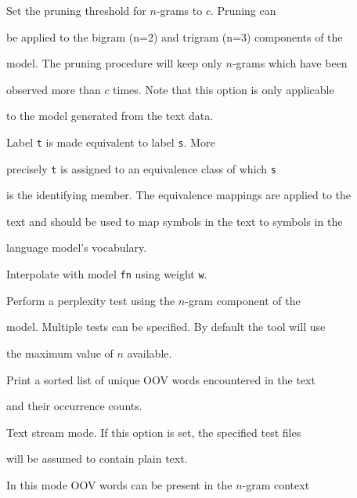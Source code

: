 \begin{optlist}





   Set the pruning threshold for $n$-grams to $c$.  Pruning can


	be applied to the bigram (n=2) and trigram (n=3) components of the


	model. The pruning procedure will keep only $n$-grams which have been


	observed more than $c$ times. Note that this option is only applicable


	to the model generated from the text data.





   Label {\tt t} is made equivalent to label {\tt s}. More 


	precisely {\tt t} is assigned to an equivalence class of which {\tt s}


	is the identifying member. The equivalence mappings are applied to the


	text and should be used to map symbols in the text to symbols in the


	language model's vocabulary.





   Interpolate with model {\tt fn} using weight {\tt w}.





   Perform a perplexity test using the $n$-gram component of the


	model. Multiple tests can be specified. By default the tool will use


	the maximum value of $n$ available.





   Print a sorted list of unique OOV words encountered in the text


	and their occurrence counts.





   Text stream mode. If this option is set, the specified test files 


	will be assumed to contain plain text. 





   In this mode OOV words can be present in the $n$-gram context



\end{optlist}
